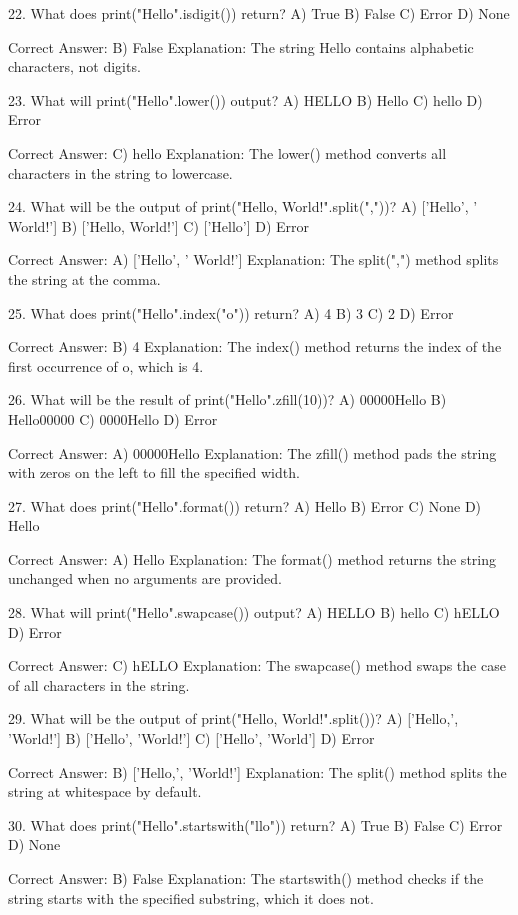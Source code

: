 22. What does print("Hello".isdigit()) return?
A) True
B) False
C) Error
D) None

Correct Answer: B) False
Explanation: The string Hello contains alphabetic characters, not digits.

23. What will print("Hello".lower()) output?
A) HELLO
B) Hello
C) hello
D) Error

Correct Answer: C) hello
Explanation: The lower() method converts all characters in the string to lowercase.

24. What will be the output of print("Hello, World!".split(","))?
A) ['Hello', ' World!']
B) ['Hello, World!']
C) ['Hello']
D) Error

Correct Answer: A) ['Hello', ' World!']
Explanation: The split(",") method splits the string at the comma.

25. What does print("Hello".index("o")) return?
A) 4
B) 3
C) 2
D) Error

Correct Answer: B) 4
Explanation: The index() method returns the index of the first occurrence of o, which is 4.

26. What will be the result of print("Hello".zfill(10))?
A) 00000Hello
B) Hello00000
C) 0000Hello
D) Error

Correct Answer: A) 00000Hello
Explanation: The zfill() method pads the string with zeros on the left to fill the specified width.

27. What does print("Hello".format()) return?
A) Hello
B) Error
C) None
D) Hello {}

Correct Answer: A) Hello
Explanation: The format() method returns the string unchanged when no arguments are provided.

28. What will print("Hello".swapcase()) output?
A) HELLO
B) hello
C) hELLO
D) Error

Correct Answer: C) hELLO
Explanation: The swapcase() method swaps the case of all characters in the string.

29. What will be the output of print("Hello, World!".split())?
A) ['Hello,', 'World!']
B) ['Hello', 'World!']
C) ['Hello', 'World']
D) Error

Correct Answer: B) ['Hello,', 'World!']
Explanation: The split() method splits the string at whitespace by default.

30. What does print("Hello".startswith("llo")) return?
A) True
B) False
C) Error
D) None

Correct Answer: B) False
Explanation: The startswith() method checks if the string starts with the specified substring, which it does not.

